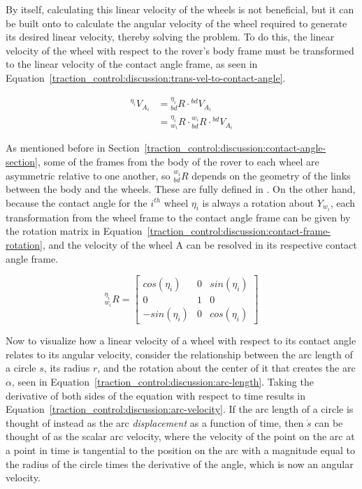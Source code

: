 By itself, calculating this linear velocity of the wheels is not beneficial, but it can be built onto to calculate the angular velocity of the wheel required to generate its desired linear velocity, thereby solving the problem. To do this, the linear velocity of the wheel with respect to the rover's body frame must be transformed to the linear velocity of the contact angle frame, as seen in Equation~\ref{traction_control:discussion:trans-vel-to-contact-angle}.

\begin{equation}\label{traction_control:discussion:trans-vel-to-contact-angle}
	\begin{split}
		{}^{\eta_{i}}V_{A_{i}} & = {}^{\eta_{i}}_{bd}R \cdot {}^{bd}V_{A_{i}} \\
		& = {}^{\eta_{i}}_{w_{i}}R \cdot {}^{w_{i}}_{bd}R \cdot {}^{bd}V_{A_{i}}
	\end{split}
\end{equation}

As mentioned before in Section~\ref{traction_control:discussion:contact-angle-section}, some of the frames from the body of the rover to each wheel are asymmetric relative to one another, so ${}^{w_{i}}_{bd}R$ depends on the geometry of the links between the body and the wheels. These are fully defined in \cite{tractl}. On the other hand, because the contact angle for the $i^{th}$ wheel $\eta_{i}$ is always a rotation about $Y_{w_{i}}$, each transformation from the wheel frame to the contact angle frame can be given by the rotation matrix in Equation~\ref{traction_control:discussion:contact-frame-rotation}, and the velocity of the wheel A can be resolved in its respective contact angle frame.

\begin{equation}\label{traction_control:discussion:contact-frame-rotation}
	{}^{\eta_{i}}_{w_{i}}R = \left[\begin{array}{ccc}
		cos(\eta_{i})  & 0 & sin(\eta_{i}) \\
		0              & 1 & 0 \\
		-sin(\eta_{i}) & 0 & cos(\eta_{i})
	\end{array}\right]
\end{equation}

Now to visualize how a linear velocity of a wheel with respect to its contact angle relates to its angular velocity, consider the relationship between the arc length of a circle $s$, its radius $r$, and the rotation about the center of it that creates the arc $\alpha$, seen in Equation~\ref{traction_control:discussion:arc-length}. Taking the derivative of both sides of the equation with respect to time results in Equation~\ref{traction_control:discussion:arc-velocity}. If the arc length of a circle is thought of instead as the arc \textit{displacement} as a function of time, then $\dot{s}$ can be thought of as the scalar arc velocity, where the velocity of the point on the arc at a point in time is tangential to the position on the arc with a magnitude equal to the radius of the circle times the derivative of the angle, which is now an angular velocity.

